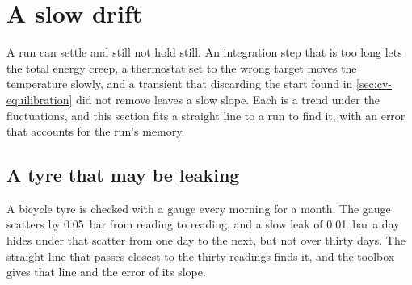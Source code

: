\section{A slow drift}
\label{sec:cv-drift}

A run can settle and still not hold still. An integration step that is too
long lets the total energy creep, a thermostat set to the wrong target
moves the temperature slowly, and a transient that discarding the start
found in \cref{sec:cv-equilibration} did not remove leaves a slow slope. Each is a
trend under the fluctuations, and this section fits a straight line to a
run to find it, with an error that accounts for the run's memory.

\subsection*{A tyre that may be leaking}

A bicycle tyre is checked with a gauge every morning for a month. The
gauge scatters by \SI{0.05}{bar} from reading to reading, and a slow leak
of \SI{0.01}{bar} a day hides under that scatter from one day to the
next, but not over thirty days. The straight line that passes closest to
the thirty readings finds it, and the toolbox gives that line and the
error of its slope.

